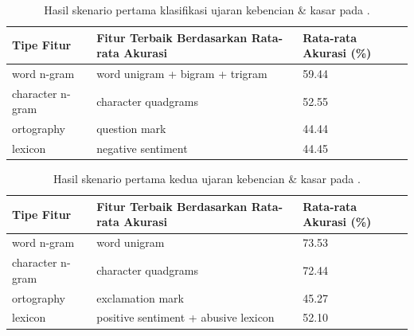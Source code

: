 \begin{table}[]
    \centering
    \caption{Hasil skenario pertama klasifikasi ujaran kebencian \& kasar pada \parencite{Ibrohim_Budi_2019}.}
    \begin{tabular}{|l|l|l|}
    \hline
    \textbf{Tipe Fitur} & \textbf{Fitur Terbaik Berdasarkan Rata-rata Akurasi} & \textbf{Rata-rata Akurasi (\%)} \\ \hline
    word n-gram              & word unigram + bigram + trigram                 & 59.44                          \\ \hline
    character n-gram         & character quadgrams                             & 52.55                          \\ \hline
    ortography               & question mark                                   & 44.44                          \\ \hline
    lexicon                  & negative sentiment                              & 44.45                          \\ \hline
    \end{tabular}
    \label{tab:Ibrohim_Budi_2019_1}
\end{table}

\begin{table}[]
    \centering
    \caption{Hasil skenario pertama kedua ujaran kebencian \& kasar pada \parencite{Ibrohim_Budi_2019}.}
    \begin{tabular}{|l|l|l|}
    \hline
    \textbf{Tipe Fitur} & \textbf{Fitur Terbaik Berdasarkan Rata-rata Akurasi} & \textbf{Rata-rata Akurasi (\%)} \\ \hline
    word n-gram              & word unigram                                    & 73.53                          \\ \hline
    character n-gram         & character quadgrams                             & 72.44                          \\ \hline
    ortography               & exclamation mark                                & 45.27                          \\ \hline
    lexicon                  & positive sentiment + abusive lexicon            & 52.10                          \\ \hline
    \end{tabular}
    \label{tab:Ibrohim_Budi_2019_2}
\end{table}


